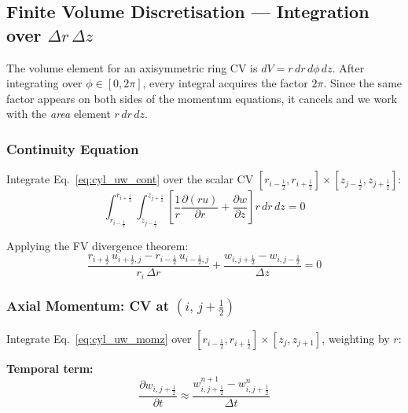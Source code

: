 \subsection{Finite Volume Discretisation --- Integration over $\Delta r\,\Delta z$}

The volume element for an axisymmetric ring CV is $dV = r\,dr\,d\phi\,dz$.
After integrating over $\phi\in[0,2\pi]$, every integral acquires the factor $2\pi$.
Since the same factor appears on both sides of the momentum equations, it cancels and we work with the \emph{area} element $r\,dr\,dz$.

\subsubsection{Continuity Equation}

Integrate Eq.~\eqref{eq:cyl_uw_cont} over the scalar CV
$[r_{i-\frac{1}{2}},r_{i+\frac{1}{2}}]\times[z_{j-\frac{1}{2}},z_{j+\frac{1}{2}}]$:
\begin{equation}
    \int_{r_{i-\frac{1}{2}}}^{r_{i+\frac{1}{2}}}
    \int_{z_{j-\frac{1}{2}}}^{z_{j+\frac{1}{2}}}
    \left[\frac{1}{r}\frac{\partial(ru)}{\partial r}+\frac{\partial w}{\partial z}\right]
    r\,dr\,dz = 0
\end{equation}

Applying the FV divergence theorem:
\begin{equation}
\boxed{
    \frac{r_{i+\frac{1}{2}}\,u_{i+\frac{1}{2},j} - r_{i-\frac{1}{2}}\,u_{i-\frac{1}{2},j}}{r_i\,\Delta r}
    + \frac{w_{i,j+\frac{1}{2}} - w_{i,j-\frac{1}{2}}}{\Delta z} = 0
}
\label{eq:cyl_uw_disc_cont}
\end{equation}

\subsubsection{Axial Momentum: CV at $(i,\,j+\tfrac{1}{2})$}

Integrate Eq.~\eqref{eq:cyl_uw_momz} over $[r_{i-\frac{1}{2}},r_{i+\frac{1}{2}}]\times[z_j,z_{j+1}]$,
weighting by $r$:

\textbf{Temporal term:}
\begin{equation}
    \frac{\partial w_{i,j+\frac{1}{2}}}{\partial t}
    \approx \frac{w_{i,j+\frac{1}{2}}^{n+1}-w_{i,j+\frac{1}{2}}^{n}}{\Delta t}
\end{equation}

